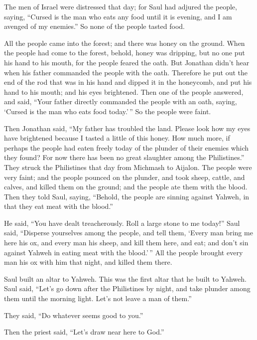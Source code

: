  The men of Israel were distressed that day; for Saul had
adjured the people, saying, ``Cursed is the man who eats any food until
it is evening, and I am avenged of my enemies.'' So none of the people
tasted food.

 All the people came into the forest; and there was honey
on the ground.  When the people had come to the forest,
behold, honey was dripping, but no one put his hand to his mouth, for
the people feared the oath.  But Jonathan didn't hear when
his father commanded the people with the oath. Therefore he put out the
end of the rod that was in his hand and dipped it in the honeycomb, and
put his hand to his mouth; and his eyes brightened.  Then
one of the people answered, and said, ``Your father directly commanded
the people with an oath, saying, `Cursed is the man who eats food
today.'\,'' So the people were faint.

 Then Jonathan said, ``My father has troubled the land.
Please look how my eyes have brightened because I tasted a little of
this honey.  How much more, if perhaps the people had eaten
freely today of the plunder of their enemies which they found? For now
there has been no great slaughter among the Philistines.'' 
They struck the Philistines that day from Michmash to Aijalon. The
people were very faint;  and the people pounced on the
plunder, and took sheep, cattle, and calves, and killed them on the
ground; and the people ate them with the blood.  Then they
told Saul, saying, ``Behold, the people are sinning against Yahweh, in
that they eat meat with the blood.''

He said, ``You have dealt treacherously. Roll a large stone to me
today!''  Saul said, ``Disperse yourselves among the
people, and tell them, `Every man bring me here his ox, and every man
his sheep, and kill them here, and eat; and don't sin against Yahweh in
eating meat with the blood.'\,'' All the people brought every man his ox
with him that night, and killed them there.

 Saul built an altar to Yahweh. This was the first altar
that he built to Yahweh.  Saul said, ``Let's go down after
the Philistines by night, and take plunder among them until the morning
light. Let's not leave a man of them.''

They said, ``Do whatever seems good to you.''

Then the priest said, ``Let's draw near here to God.''

